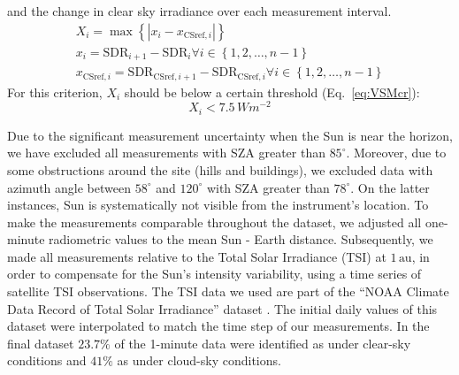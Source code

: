 \documentclass[applsci,article,submit,moreauthors,pdftex]{Definitions/mdpi}
\begin{document}
\begin{enumerate}
  and the change in clear sky irradiance over each measurement interval.
  \begin{gather}
    X_i = \max{\left \{ \left | x_i - x_{\text{CSref},i} \right | \right \}} \label{eq:VSM3} \\
    x_i = \text{SDR}_{i+1} - \text{SDR}_{i} \forall i \in \left \{ 1, 2, \ldots, n-1 \right \} \label{eq:VSM1} \\
    x_{\text{CSref},i} = \text{SDR}_{\text{CSref},i+1} - \text{SDR}_{\text{CSref},i} \forall i \in \left \{ 1, 2, \ldots, n-1 \right \} \label{eq:VSM2}
  \end{gather} For this criterion, \(X_i\) should be below a certain
  threshold (Eq.~\ref{eq:VSMcr}): \begin{equation}
    X_i < 7.5\,Wm^{-2} \label{eq:VSMcr}
  \end{equation}
\end{enumerate}

Due to the significant measurement uncertainty when the Sun is near the
horizon, we have excluded all measurements with SZA greater than
\(85^\circ\). Moreover, due to some obstructions around the site (hills
and buildings), we excluded data with azimuth angle between \(58^\circ\)
and \(120^\circ\) with SZA greater than \(78^\circ\). On the latter
instances, Sun is systematically not visible from the instrument's
location. To make the measurements comparable throughout the dataset, we
adjusted all one-minute radiometric values to the mean Sun - Earth
distance. Subsequently, we made all measurements relative to the Total
Solar Irradiance (TSI) at \(1\,\text{au}\), in order to compensate for
the Sun's intensity variability, using a time series of satellite TSI
observations. The TSI data we used are part of the ``NOAA Climate Data
Record of Total Solar Irradiance'' dataset \citep{Coddington2005}. The
initial daily values of this dataset were interpolated to match the time
step of our measurements. In the final dataset \(23.7\%\) of the
1-minute data were identified as under clear-sky conditions and \(41\%\)
as under cloud-sky conditions.
\end{document}
